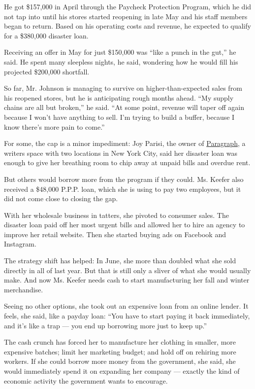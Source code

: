 He got \$157,000 in April through the Paycheck Protection Program, which
he did not tap into until his stores started reopening in late May and
his staff members began to return. Based on his operating costs and
revenue, he expected to qualify for a \$380,000 disaster loan.

Receiving an offer in May for just \$150,000 was ``like a punch in the
gut,'' he said. He spent many sleepless nights, he said, wondering how
he would fill his projected \$200,000 shortfall.

So far, Mr. Johnson is managing to survive on higher-than-expected sales
from his reopened stores, but he is anticipating rough months ahead.
``My supply chains are all but broken,'' he said. ``At some point,
revenue will taper off again because I won't have anything to sell. I'm
trying to build a buffer, because I know there's more pain to come.''

For some, the cap is a minor impediment: Joy Parisi, the owner of
\href{https://www.paragraphny.com/}{Paragraph}, a writers space with two
locations in New York City, said her disaster loan was enough to give
her breathing room to chip away at unpaid bills and overdue rent.

But others would borrow more from the program if they could. Ms. Keefer
also received a \$48,000 P.P.P. loan, which she is using to pay two
employees, but it did not come close to closing the gap.

With her wholesale business in tatters, she pivoted to consumer sales.
The disaster loan paid off her most urgent bills and allowed her to hire
an agency to improve her retail website. Then she started buying ads on
Facebook and Instagram.

The strategy shift has helped: In June, she more than doubled what she
sold directly in all of last year. But that is still only a sliver of
what she would usually make. And now Ms. Keefer needs cash to start
manufacturing her fall and winter merchandise.

Seeing no other options, she took out an expensive loan from an online
lender. It feels, she said, like a payday loan: ``You have to start
paying it back immediately, and it's like a trap --- you end up
borrowing more just to keep up.''

The cash crunch has forced her to manufacture her clothing in smaller,
more expensive batches; limit her marketing budget; and hold off on
rehiring more workers. If she could borrow more money from the
government, she said, she would immediately spend it on expanding her
company --- exactly the kind of economic activity the government wants
to encourage.

